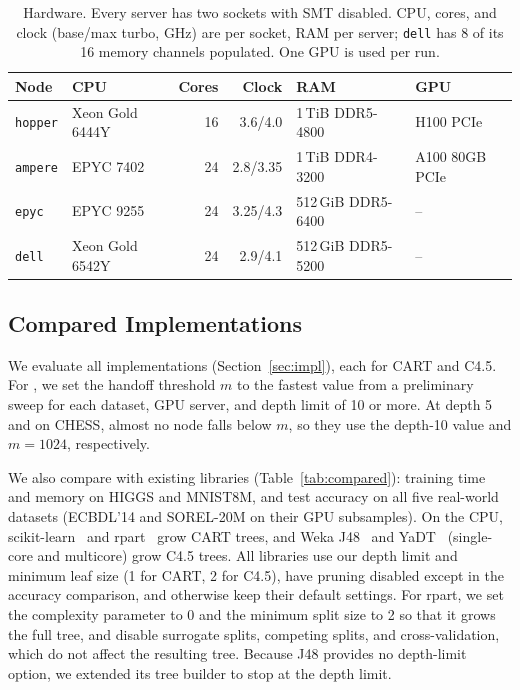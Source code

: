 \begin{table}
\caption{Hardware. Every server has two sockets with SMT disabled. CPU, cores, and clock (base/max turbo, GHz) are per socket, RAM per server; \texttt{dell} has 8 of its 16 memory channels populated. One GPU is used per run.}
\label{tab:hardware}
\centering
\begin{tabular}{@{}llrrll@{}}
\toprule
Node & CPU & Cores & Clock & RAM & GPU \\
\midrule
\texttt{hopper} & Xeon Gold 6444Y & 16 & 3.6/4.0  & 1\,TiB DDR5-4800   & H100 PCIe \\
\texttt{ampere} & EPYC 7402       & 24 & 2.8/3.35 & 1\,TiB DDR4-3200   & A100 80GB PCIe \\
\texttt{epyc}   & EPYC 9255       & 24 & 3.25/4.3 & 512\,GiB DDR5-6400 & -- \\
\texttt{dell}   & Xeon Gold 6542Y & 24 & 2.9/4.1  & 512\,GiB DDR5-5200 & -- \\
\bottomrule
\end{tabular}
\end{table}

\subsection{Compared Implementations}
\label{sec:compared}

We evaluate all implementations (Section~\ref{sec:impl}), each for CART and C4.5. For \ImplHybrid{}, we set the handoff threshold $m$ to the fastest value from a preliminary sweep for each dataset, GPU server, and depth limit of 10 or more. At depth 5 and on CHESS, almost no node falls below $m$, so they use the depth-10 value and $m = 1024$, respectively.

We also compare with existing libraries (Table~\ref{tab:compared}): training time and memory on HIGGS and MNIST8M, and test accuracy on all five real-world datasets (ECBDL'14 and SOREL-20M on their GPU subsamples). On the CPU, scikit-learn~\cite{pedregosa2011sklearn} and rpart~\cite{therneau2026rpart} grow CART trees, and Weka J48~\cite{hall2009weka} and YaDT~\cite{ruggieri2004yadt} (single-core and multicore) grow C4.5 trees. All libraries use our depth limit and minimum leaf size (1 for CART, 2 for C4.5), have pruning disabled except in the accuracy comparison, and otherwise keep their default settings. For rpart, we set the complexity parameter to 0 and the minimum split size to 2 so that it grows the full tree, and disable surrogate splits, competing splits, and cross-validation, which do not affect the resulting tree. Because J48 provides no depth-limit option, we extended its tree builder to stop at the depth limit.

